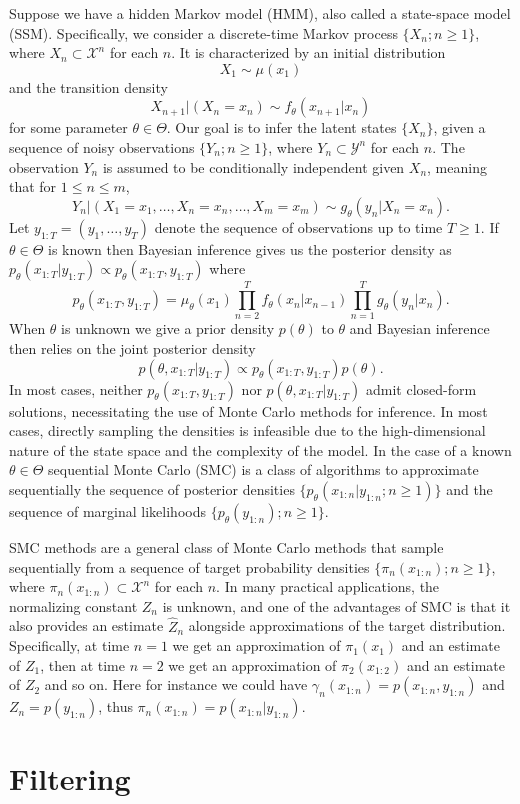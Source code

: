 Suppose we have a hidden Markov model (HMM), also called a state-space model (SSM). Specifically, we consider a discrete-time Markov process $\{X_n; n\geq 1\}$, where  $X_n \subset \mathcal{X}^n$ for each $n$. It is characterized by an initial distribution 
\[
X_1 \sim \mu(x_1)
\] 
and the transition density
\[
X_{n+1} \vert (X_n=x_n) \sim f_\theta(x_{n+1} \vert x_n)
\]
for some parameter $\theta \in \Theta$. Our goal is to infer the latent states $\{X_n\}$, given a sequence of noisy observations $\{Y_n; n\geq 1\}$, where $Y_n \subset \mathcal{Y}^n$ for each $n$. The observation $Y_n$ is assumed to be conditionally independent given $X_n$, meaning that for $1\leq n\leq m$,
\[
Y_n \vert (X_1=x_1,\dots, X_n=x_n,\dots,X_m=x_m) \sim g_\theta(y_n \vert X_n=x_n).
\]
Let $y_{1:T}=(y_1,\dots,y_T)$ denote the sequence of observations up to time $T\geq 1$. If $\theta\in \Theta$ is known then Bayesian inference gives us the posterior density as $p_\theta(x_{1:T} \vert y_{1:T}) \propto p_\theta(x_{1:T}, y_{1:T})$ where
\[
p_\theta(x_{1:T}, y_{1:T})=\mu_\theta(x_1)\prod_{n=2}^{T}f_\theta(x_n\vert x_{n-1})\prod_{n=1}^{T}g_\theta(y_n \vert x_n).
\]
When $\theta$ is unknown we give a prior density $p(\theta)$ to $\theta$ and Bayesian inference then relies on the joint posterior density
\[
p(\theta,x_{1:T}\vert y_{1:T}) \propto p_\theta(x_{1:T}, y_{1:T})p(\theta). 
\]
In most cases, neither $p_\theta(x_{1:T}, y_{1:T})$ nor $p(\theta,x_{1:T}\vert y_{1:T})$ admit closed-form solutions, necessitating the use of Monte Carlo methods for inference. In most cases, directly sampling the densities 
is infeasible due to the high-dimensional nature of the state space and the complexity of the model. In the case of a known $\theta \in \Theta$ sequential Monte Carlo (SMC) is a class of algorithms to approximate sequentially the
sequence of posterior densities $\{p_\theta(x_{1:n}\vert y_{1:n}; n\geq 1)\}$ and the sequence of marginal likelihoods $\{p_\theta(y_{1:n}); n\geq 1\}$.

SMC methods are a general class of Monte Carlo methods that sample sequentially from a sequence of target
probability densities $\{\pi_n(x_{1:n}); n\geq 1\}$, where $\pi_n(x_{1:n}) \subset \mathcal{X}^n$ for each $n$. 
In many practical applications, the normalizing constant $Z_n$ is unknown, and one of the advantages of SMC is that it also provides an estimate $\widehat{Z}_n$ alongside approximations of the target distribution.
Specifically, at time $n=1$ we get an approximation of $\pi_1(x_1)$ and an estimate of $Z_1$, then at time $n=2$ we get an approximation of $\pi_2(x_{1:2})$ and an estimate of $Z_2$ and so on. Here for instance we could have $\gamma_n(x_{1:n})=p(x_{1:n}, y_{1:n})$ and $Z_n=p(y_{1:n})$, thus $\pi_n(x_{1:n})=p(x_{1:n}\vert y_{1:n})$.

\section{Filtering}
